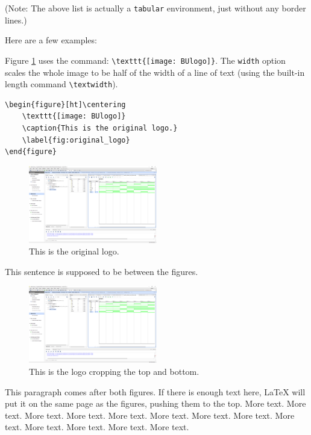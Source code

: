\documentclass[11pt]{article}
\begin{document}
(Note: The above list is actually a \verb|tabular| environment, just without any border lines.)

Here are a few examples:

Figure \ref{fig:original_logo} uses the command: \verb|\texttt{[image: BUlogo]}|.  The \texttt{width} option scales the whole image to be half of the width of a line of text (using the built-in length command \verb|\textwidth|).

\begin{verbatim}
\begin{figure}[ht]\centering
    \texttt{[image: BUlogo]}
    \caption{This is the original logo.}
    \label{fig:original_logo}
\end{figure}
\end{verbatim}

\begin{figure}[ht]\centering
	\includegraphics[width=0.5\textwidth]{Lab1Table}
	\caption{This is the original logo.}
	\label{fig:original_logo}			%
\end{figure}

This sentence is supposed to be between the figures.

\begin{figure}[ht]\centering
	\includegraphics[width=0.5\textwidth,trim=0cm 5cm 0cm 5cm,clip]{Lab1Table}
	\caption{This is the logo cropping the top and bottom.}
	\label{fig:another_image}		%
\end{figure}


This paragraph comes after both figures. If there is enough text here, LaTeX will put it on the same page as the figures, pushing them to the top.  More text. More text. More text. More text. More text. More text. More text. More text. More text. More text. More text. More text. More text.
\end{document}
